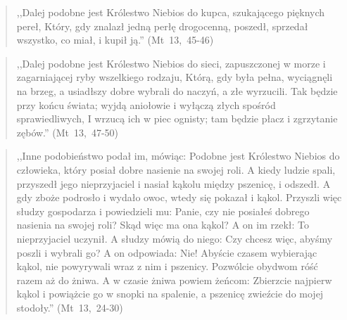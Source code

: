 \documentclass[10pt,a4paper,oneside]{article}
\begin{document}
\begin{quote}
,,Dalej podobne jest Królestwo Niebios do kupca, szukającego pięknych pereł, Który, gdy znalazł jedną perłę drogocenną, poszedł, sprzedał wszystko, co miał, i kupił ją.'' \mbox{(Mt 13, 45-46)}
\end{quote}
\begin{quote}
,,Dalej podobne jest Królestwo Niebios do sieci, zapuszczonej w morze i zagarniającej ryby wszelkiego rodzaju, Którą, gdy była pełna, wyciągnęli na brzeg, a usiadłszy dobre wybrali do naczyń, a złe wyrzucili. Tak będzie przy końcu świata; wyjdą aniołowie i wyłączą złych spośród sprawiedliwych, I wrzucą ich w piec ognisty; tam będzie płacz i zgrzytanie zębów.'' \mbox{(Mt 13, 47-50)}
\end{quote}
\begin{quote}
,,Inne podobieństwo podał im, mówiąc: Podobne jest Królestwo Niebios do człowieka, który posiał dobre nasienie na swojej roli. A kiedy ludzie spali, przyszedł jego nieprzyjaciel i nasiał kąkolu między pszenicę, i odszedł. A gdy zboże podrosło i wydało owoc, wtedy się pokazał i kąkol. Przyszli więc słudzy gospodarza i powiedzieli mu: Panie, czy nie posiałeś dobrego nasienia na swojej roli? Skąd więc ma ona kąkol? A on im rzekł: To nieprzyjaciel uczynił. A słudzy mówią do niego: Czy chcesz więc, abyśmy poszli i wybrali go? A on odpowiada: Nie! Abyście czasem wybierając kąkol, nie powyrywali wraz z nim i pszenicy. Pozwólcie obydwom róść razem aż do żniwa. A w czasie żniwa powiem żeńcom: Zbierzcie najpierw kąkol i powiążcie go w snopki na spalenie, a pszenicę zwieźcie do mojej stodoły.'' \mbox{(Mt 13, 24-30)}
\end{quote}
\end{document}
